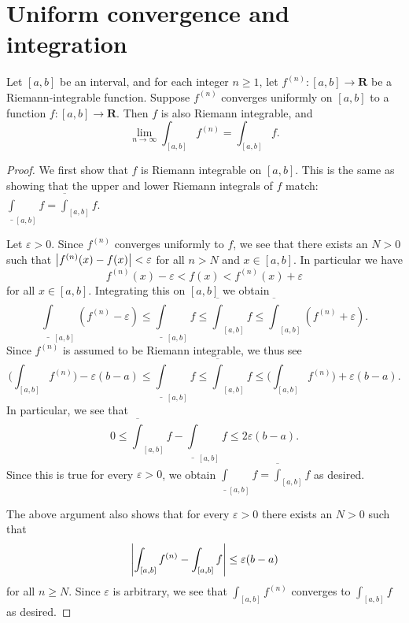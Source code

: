 \section{Uniform convergence and integration}\label{sec 3.6}

\begin{theorem}\label{3.6.1}
    Let \([a, b]\) be an interval, and for each integer \(n \geq 1\), let \(f^{(n)} : [a, b] \to \mathbf{R}\) be a Riemann-integrable function.
    Suppose \(f^{(n)}\) converges uniformly on \([a, b]\) to a function \(f : [a, b] \to \mathbf{R}\).
    Then \(f\) is also Riemann integrable, and
    \[
        \lim_{n \to \infty} \int_{[a, b]} f^{(n)} = \int_{[a, b]} f.
    \]
\end{theorem}

\begin{proof}
    We first show that \(f\) is Riemann integrable on \([a, b]\).
    This is the same as showing that the upper and lower Riemann integrals of \(f\) match:
    \(\underline{\int}_{[a, b]} f = \overline{\int}_{[a, b]} f\).

    Let \(\varepsilon > 0\).
    Since \(f^{(n)}\) converges uniformly to \(f\), we see that there exists an \(N > 0\) such that \(\abs*{f^{(n)}(x) - f(x)} < \varepsilon\) for all \(n > N\) and \(x \in [a, b]\).
    In particular we have
    \[
        f^{(n)}(x) - \varepsilon < f(x) < f^{(n)}(x) + \varepsilon
    \]
    for all \(x \in [a, b]\).
    Integrating this on \([a, b]\) we obtain
    \[
        \underline{\int}_{[a, b]} (f^{(n)} - \varepsilon) \leq \underline{\int}_{[a, b]} f \leq \overline{\int}_{[a, b]} f \leq \overline{\int}_{[a, b]} (f^{(n)} + \varepsilon).
    \]
    Since \(f^{(n)}\) is assumed to be Riemann integrable, we thus see
    \[
        \Bigg(\int_{[a, b]} f^{(n)}\Bigg) - \varepsilon (b - a) \leq \underline{\int}_{[a, b]} f \leq \overline{\int}_{[a, b]} f \leq \Bigg(\int_{[a, b]} f^{(n)}\Bigg) + \varepsilon (b - a).
    \]
    In particular, we see that
    \[
        0 \leq \overline{\int}_{[a, b]} f - \underline{\int}_{[a, b]} f \leq 2 \varepsilon (b - a).
    \]
    Since this is true for every \(\varepsilon > 0\), we obtain \(\underline{\int}_{[a, b]} f = \overline{\int}_{[a, b]} f\) as desired.

    The above argument also shows that for every \(\varepsilon > 0\) there exists an \(N > 0\) such that
    \[
        \abs*{\int_{[a, b]} f^{(n)} - \int_{[a, b]} f} \leq \varepsilon (b - a)
    \]
    for all \(n \geq N\).
    Since \(\varepsilon\) is arbitrary, we see that \(\int_{[a, b]} f^{(n)}\) converges to \(\int_{[a, b]} f\) as desired.
\end{proof}

